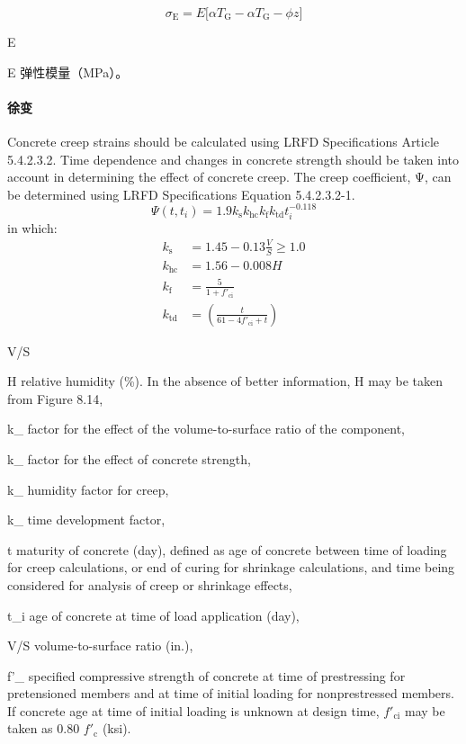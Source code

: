 \begin{equation}
  \sigma_\text{E} = E \big[ \alpha T_\text{G} -\alpha T_\text{G} -\phi z \big]
\end{equation}
\begin{EqDesc}{E}
  \item[E] 弹性模量（\unit{MPa}）。
\end{EqDesc}

\paragraph{徐变}
Concrete creep strains should be calculated using LRFD Specifications Article 5.4.2.3.2. Time dependence and changes in concrete strength should be taken into account in determining the effect of concrete creep. The creep coefficient, Ψ, can be determined using LRFD Specifications Equation 5.4.2.3.2-1.
\begin{equation}
  \Psi (t,t_i) =1.9 k_\text{s} k_\text{hc}k_\text{f}k_\text{td}t_i^{-0.118}
\end{equation}
in which:
\begin{align}
  k_\text{s}  & = 1.45-0.13\frac{V}{S} \geqslant 1.0 \\
  k_\text{hc} & = 1.56-0.008H \\
  k_\text{f}  & = \frac{5}{1+f'_\text{ci}}\\
  k_\text{td} & = \left( \frac{t}{61- 4 f'_\text{ci} +t }\right)
\end{align}
\begin{EqDesc}{V/S}
  \item[H] relative humidity (\%). In the absence of better information, H may be taken from Figure 8.14,
  \item[k_\text{s}] factor for the effect of the volume-to-surface ratio of the component,
  \item[k_\text{hc}] factor for the effect of concrete strength,
  \item[k_\text{f}] humidity factor for creep,
  \item[k_\text{td}] time development factor,
  \item[t] maturity of concrete (day), defined as age of concrete between time of loading for creep
  calculations, or end of curing for shrinkage calculations, and time being considered for
  analysis of creep or shrinkage effects,
  \item[t_i] age of concrete at time of load application (day),
  \item[V/S] volume-to-surface ratio (in.),
  \item[f'_\text{ci}] specified compressive strength of concrete at time of prestressing for pretensioned members and at time of initial loading for nonprestressed members. If concrete age at time of initial loading is unknown at design time, $f'_\text{ci}$ may be taken as 0.80 $f'_\text{c}$ (ksi).
\end{EqDesc}

